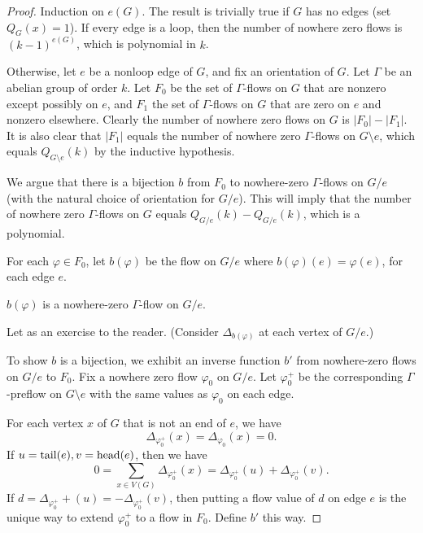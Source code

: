 \documentclass[main.tex]{subfiles}
\begin{document}
\begin{proof}
  Induction on $e(G)$.
  The result is trivially true if $G$ has no edges (set $Q_G(x) = 1$).
  If every edge is a loop, then the number of nowhere zero flows is
  $(k-1)^{e(G)}$, which is polynomial in $k$.

  Otherwise, let $e$ be a nonloop edge of $G$, and fix an orientation of $G$.
  Let $\Gamma$ be an abelian group of order $k$.
  Let $F_0$ be the set of $\Gamma$-flows on $G$ that are nonzero except possibly on $e$,
  and $F_1$ the set of $\Gamma$-flows on $G$ that are zero on $e$ and nonzero
  elsewhere.
  Clearly the number of nowhere zero flows on $G$ is $|F_0| - |F_1|$.
  It is also clear that $|F_1|$ equals the number of nowhere zero $\Gamma$-flows
  on $G\setminus e$, which equals $Q_{G\setminus e}(k)$ by the inductive hypothesis.

  We argue that there is a bijection $b$ from $F_0$ to nowhere-zero
  $\Gamma$-flows on $G/e$ (with the natural choice of orientation for $G/e$).
  This will imply that the number of nowhere zero $\Gamma$-flows on $G$ equals
  $Q_{G/e}(k) - Q_{G/e}(k)$, which is a polynomial.

  For each $\varphi\in F_0$, let $b(\varphi)$ be the flow on $G/e$ where
  $b(\varphi)(e) = \varphi(e)$, for each edge $e$.
  \begin{claim}
    $b(\varphi)$ is a nowhere-zero $\Gamma$-flow on $G/e$.
  \end{claim}
  \begin{subproof}
    Let as an exercise to the reader.
    (Consider $\Delta_{b(\varphi)}$ at each vertex of $G/e$.)
  \end{subproof}
  To show $b$ is a bijection, we exhibit an inverse function $b'$ from
  nowhere-zero flows on $G/e$ to $F_0$.
  Fix a nowhere zero flow $\varphi_0$ on $G/e$.
  Let $\varphi_0^+$ be the corresponding $\Gamma$-preflow on $G\setminus e$
  with the same values as $\varphi_0$ on each edge.

  For each vertex $x$ of $G$ that is not an end of $e$, we have
  \[
    \Delta_{\varphi_0^+}(x) = \Delta_{\varphi_0}(x) = 0.
  \]
  If $u = \operatorname{tail}(e), v = \operatorname{head}(e)$, then we have
  \[
    0 = \sum_{x\in V(G)}\Delta_{\varphi_0^+}(x)
    = \Delta_{\varphi_0^+}(u) + \Delta_{\varphi_0^+}(v).
  \]
  If $d = \Delta_{\varphi_0^+}+(u) = -\Delta_{\varphi_0^+}(v)$, then putting a
  flow value of $d$ on edge $e$ is the unique way to extend $\varphi_0^+$ to a
  flow in $F_0$.
  Define $b'$ this way.
\end{proof}
\end{document}
